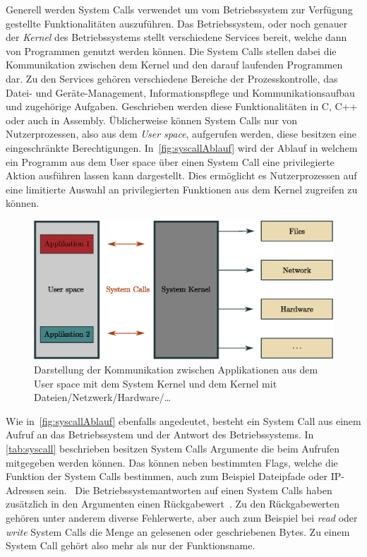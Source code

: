         Generell werden System Calls verwendet um vom Betriebssystem zur Verfügung gestellte Funktionalitäten auszuführen.
        Das Betriebssystem, oder noch genauer der \textit{Kernel}  des Betriebssystems stellt verschiedene Services bereit, welche dann von Programmen genutzt werden können. 
        Die System Calls stellen dabei die Kommunikation zwischen dem Kernel und den darauf laufenden Programmen dar.
        Zu den Services gehören verschiedene Bereiche der Prozesskontrolle, das Datei- und Geräte-Management, Informationspflege und Kommunikationsaufbau und zugehörige Aufgaben.
        Geschrieben werden diese Funktionalitäten in C, C++ oder auch in Assembly.
        Üblicherweise können System Calls nur von Nutzerprozessen, also aus dem \textit{User space}, aufgerufen werden, diese besitzen eine eingeschränkte Berechtigungen.
        In~\autoref{fig:syscallAblauf} wird der Ablauf in welchem ein Programm aus dem User space über einen System Call eine privilegierte Aktion ausführen lassen kann dargestellt.
        Dies ermöglicht es Nutzerprozessen auf eine limitierte Auswahl an privilegierten Funktionen aus dem Kernel zugreifen zu können.~\cite{SYSCALL_SILBERSCHATZ}
    
        \begin{figure}[ht]
            \centering
            \includegraphics[width=1\textwidth]{images/Illustrationen/IDS/syscalls}
            \caption{Darstellung der Kommunikation zwischen Applikationen aus dem User space mit dem System Kernel und dem Kernel mit Dateien/Netzwerk/Hardware/\dots}
            \label{fig:syscallAblauf}
        \end{figure}

        Wie in~\autoref{fig:syscallAblauf} ebenfalls angedeutet, besteht ein System Call aus einem Aufruf an das Betriebssystem und der Antwort des Betriebssystems.
        In \autoref{tab:syscall} beschrieben besitzen System Calls Argumente die beim Aufrufen mitgegeben werden können.        
        Das können neben bestimmten Flags, welche die Funktion der System Calls bestimmen, auch zum Beispiel Dateipfade oder IP-Adressen sein.~\cite{SYSCALL_MANPAGE}
        Die Betriebssystemantworten auf einen System Calls haben zusätzlich in den Argumenten einen Rückgabewert~.
        Zu den Rückgabewerten gehören unter anderem diverse Fehlerwerte, aber auch zum Beispiel bei \textit{read} oder \textit{write} System Calls die Menge an gelesenen oder geschriebenen Bytes.
        Zu einem System Call gehört also mehr als nur der Funktionsname.


